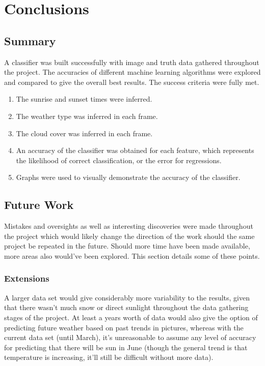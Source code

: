 \documentclass[a4paper,12pt,twoside]{report}
\begin{document}
\chapter{Conclusions}

\section{Summary}
A classifier was built successfully with image and truth data gathered throughout the project. The accuracies of different machine learning algorithms were explored and compared to give the overall best results. The success criteria were fully met.
\begin{enumerate}
  \item The sunrise and sunset times were inferred.
  \item The weather type was inferred in each frame.
  \item The cloud cover was inferred in each frame.
  \item An accuracy of the classifier was obtained for each feature, which represents the likelihood of correct classification, or the error for regressions.
  \item Graphs were used to visually demonstrate the accuracy of the classifier.
\end{enumerate}

\section{Future Work}
Mistakes and oversights as well as interesting discoveries were made throughout the project which would likely change the direction of the work should the same project be repeated in the future. Should more time have been made available, more areas also would've been explored. This section details some of these points.

\subsection{Extensions}
A larger data set would give considerably more variability to the results, given that there wasn't much snow or direct sunlight throughout the data gathering stages of the project. At least a years worth of data would also give the option of predicting future weather based on past trends in pictures, whereas with the current data set (until March), it's unreasonable to assume any level of accuracy for predicting that there will be sun in June (though the general trend is that temperature is increasing, it'll still be difficult without more data).
\end{document}
